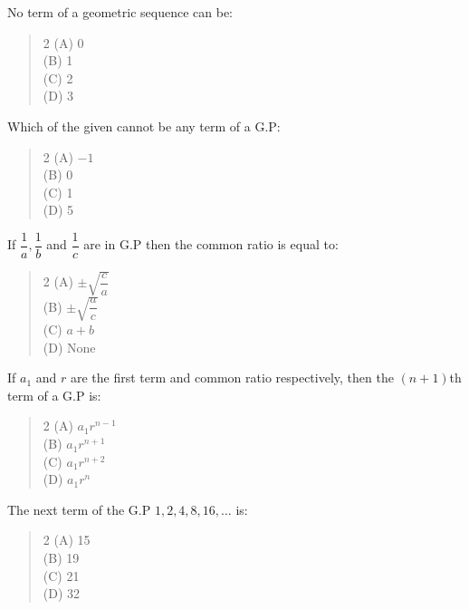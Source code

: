 \documentclass[11pt,a4paper]{article}
\begin{document}
\begin{mcqlist}
\item No term of a geometric sequence can be:
\begin{quote}\begin{multicols}{2}
\noindent (A) 0 \\
(B) 1 \\
(C) 2 \\
(D) 3
\end{multicols}\end{quote}

\item Which of the given cannot be any term of a G.P:
\begin{quote}\begin{multicols}{2}
\noindent (A) $-1$ \\
(B) 0 \\
(C) 1 \\
(D) 5
\end{multicols}\end{quote}

\item If $\dfrac{1}{a},\dfrac{1}{b}$ and $\dfrac{1}{c}$ are in G.P then the common ratio is equal to:
\begin{quote}\begin{multicols}{2}
\noindent (A) $\pm\sqrt{\dfrac{c}{a}}$ \\
(B) $\pm\sqrt{\dfrac{a}{c}}$ \\
(C) $a+b$ \\
(D) None
\end{multicols}\end{quote}

\item If $a_1$ and $r$ are the first term and common ratio respectively, then the $(n+1)$th term of a G.P is:
\begin{quote}\begin{multicols}{2}
\noindent (A) $a_1r^{n-1}$ \\
(B) $a_1r^{n+1}$ \\
(C) $a_1r^{n+2}$ \\
(D) $a_1r^{n}$
\end{multicols}\end{quote}

\item The next term of the G.P $1,2,4,8,16,\ldots$ is:
\begin{quote}\begin{multicols}{2}
\noindent (A) 15 \\
(B) 19 \\
(C) 21 \\
(D) 32
\end{multicols}\end{quote}


\end{mcqlist}
\end{document}
